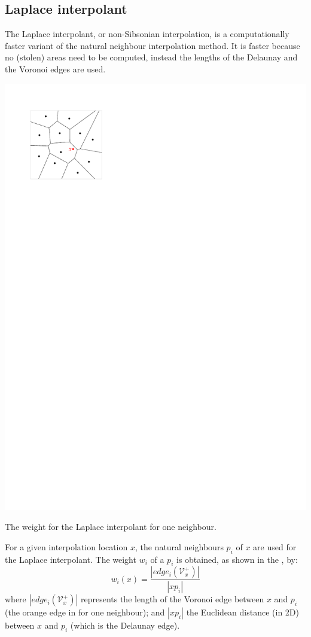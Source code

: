 \subsection{Laplace interpolant}%
\label{sec:laplace}

The Laplace interpolant, or non-Sibsonian interpolation, is a computationally faster variant of the natural neighbour interpolation method.
It is faster because no (stolen) areas need to be computed, instead the lengths of the Delaunay and the Voronoi edges are used.

%
\begin{marginfigure}
  \centering
  \includegraphics[width=\textwidth,page=3]{figs/laplace.pdf}%
  \caption{The weight for the Laplace interpolant for one neighbour.}%
\end{marginfigure}
For a given interpolation location $x$, the natural neighbours $p_i$ of $x$ are used for the Laplace interpolant.
The weight $w_i$ of a $p_i$ is obtained, as shown in the , by:
\begin{equation}
  w_{i}(x) = \frac{|edge_i(\mathcal{V}^{+}_{x})|}{|xp_i|}
  \label{eq:laplace}
\end{equation}
where $|edge_i(\mathcal{V}^{+}_{x})|$ represents the length of the Voronoi edge between $x$ and $p_i$ (the orange edge in  for one neighbour); 
and $|xp_i|$ the Euclidean distance (in 2D) between $x$ and $p_i$ (which is the Delaunay edge).

